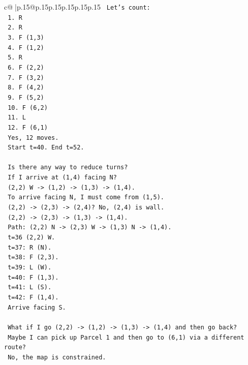 \documentclass{article}
\begin{document}
{\begin{supertabular}{c@{$\;$}|p{.15\linewidth}@{}p{.15\linewidth}p{.15\linewidth}p{.15\linewidth}p{.15\linewidth}p{.15\linewidth}}
{{{\texttt{   Let's count:} \\
\texttt{   1. R} \\
\texttt{   2. R} \\
\texttt{   3. F (1,3)} \\
\texttt{   4. F (1,2)} \\
\texttt{   5. R} \\
\texttt{   6. F (2,2)} \\
\texttt{   7. F (3,2)} \\
\texttt{   8. F (4,2)} \\
\texttt{   9. F (5,2)} \\
\texttt{   10. F (6,2)} \\
\texttt{   11. L} \\
\texttt{   12. F (6,1)} \\
\texttt{   Yes, 12 moves.} \\
\texttt{   Start t=40. End t=52.} \\
\\ 
\texttt{   Is there any way to reduce turns?} \\
\texttt{   If I arrive at (1,4) facing N?} \\
\texttt{   (2,2) W {-}> (1,2) {-}> (1,3) {-}> (1,4).} \\
\texttt{   To arrive facing N, I must come from (1,5).} \\
\texttt{   (2,2) {-}> (2,3) {-}> (2,4)? No, (2,4) is wall.} \\
\texttt{   (2,2) {-}> (2,3) {-}> (1,3) {-}> (1,4).} \\
\texttt{   Path: (2,2) N {-}> (2,3) W {-}> (1,3) N {-}> (1,4).} \\
\texttt{   t=36 (2,2) W.} \\
\texttt{   t=37: R (N).} \\
\texttt{   t=38: F (2,3).} \\
\texttt{   t=39: L (W).} \\
\texttt{   t=40: F (1,3).} \\
\texttt{   t=41: L (S).} \\
\texttt{   t=42: F (1,4).} \\
\texttt{   Arrive facing S.} \\
\\ 
\texttt{   What if I go (2,2) {-}> (1,2) {-}> (1,3) {-}> (1,4) and then go back?} \\
\texttt{   Maybe I can pick up Parcel 1 and then go to (6,1) via a different route?} \\
\texttt{   No, the map is constrained.} \\
}}}
\end{supertabular}}
\end{document}
